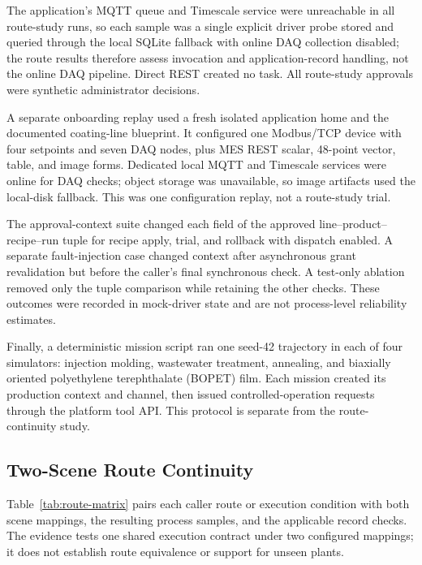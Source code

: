 The application's MQTT queue and Timescale service were unreachable in all
route-study runs, so each sample was a single explicit driver probe stored and
queried through the local SQLite fallback with online DAQ collection disabled;
the route results therefore assess invocation and application-record handling,
not the online DAQ pipeline. Direct REST created no task. All route-study
approvals were synthetic administrator decisions.

A separate onboarding replay used a fresh isolated application home and
the documented coating-line blueprint. It configured one Modbus/TCP device
with four setpoints and seven DAQ nodes, plus MES REST scalar, 48-point vector,
table, and image forms. Dedicated local MQTT and Timescale services were online
for DAQ checks; object storage was unavailable, so image artifacts used the
local-disk fallback. This was one configuration replay, not a route-study
trial.

The approval-context suite changed each field of the approved
line--product--recipe--run tuple for recipe apply, trial, and rollback with
dispatch enabled. A separate fault-injection case
changed context after asynchronous grant revalidation but before the caller's
final synchronous check. A test-only ablation removed only the tuple comparison
while retaining the other checks. These outcomes were recorded in mock-driver
state and are not process-level reliability estimates.

Finally, a deterministic mission script ran one seed-42 trajectory in each of
four simulators: injection molding, wastewater treatment, annealing, and
biaxially oriented polyethylene terephthalate (BOPET) film. Each mission
created its production context and channel, then issued controlled-operation
requests through the platform tool API. This protocol is
separate from the route-continuity study.
\subsection{Two-Scene Route Continuity}
\label{sec:testbed}
Table~\ref{tab:route-matrix} pairs each caller route or execution condition
with both scene mappings,
the resulting process samples, and the applicable record checks. The evidence
tests one shared execution contract under two configured mappings; it does not
establish route equivalence or support for unseen plants.

